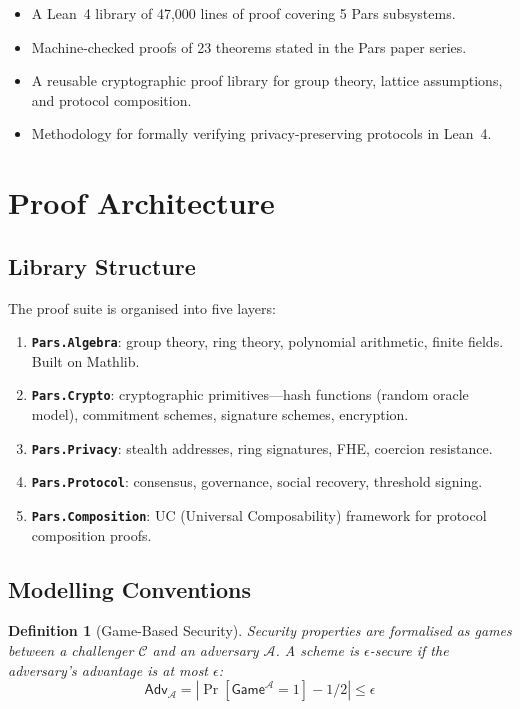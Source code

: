 \documentclass[11pt,a4paper]{article}
\newtheorem{definition}{Definition}[section]
\begin{document}
\begin{itemize}
    \item A Lean~4 library of 47{,}000 lines of proof covering 5
    Pars subsystems.
    \item Machine-checked proofs of 23 theorems stated in the Pars
    paper series.
    \item A reusable cryptographic proof library for group theory,
    lattice assumptions, and protocol composition.
    \item Methodology for formally verifying privacy-preserving
    protocols in Lean~4.
\end{itemize}

\section{Proof Architecture}
\label{sec:architecture}

\subsection{Library Structure}

The proof suite is organised into five layers:

\begin{enumerate}
    \item \textbf{\texttt{Pars.Algebra}}: group theory, ring theory,
    polynomial arithmetic, finite fields.  Built on Mathlib.
    \item \textbf{\texttt{Pars.Crypto}}: cryptographic primitives---hash
    functions (random oracle model), commitment schemes, signature
    schemes, encryption.
    \item \textbf{\texttt{Pars.Privacy}}: stealth addresses, ring
    signatures, FHE, coercion resistance.
    \item \textbf{\texttt{Pars.Protocol}}: consensus, governance, social
    recovery, threshold signing.
    \item \textbf{\texttt{Pars.Composition}}: UC (Universal
    Composability) framework for protocol composition proofs.
\end{enumerate}

\subsection{Modelling Conventions}

\begin{definition}[Game-Based Security]
    Security properties are formalised as games between a challenger
    $\mathcal{C}$ and an adversary $\mathcal{A}$.  A scheme is
    $\epsilon$-secure if the adversary's advantage is at most $\epsilon$:
    \[
        \mathsf{Adv}_{\mathcal{A}} =
        |\Pr[\mathsf{Game}^{\mathcal{A}} = 1] - 1/2| \leq \epsilon
    \]
\end{definition}
\end{document}
